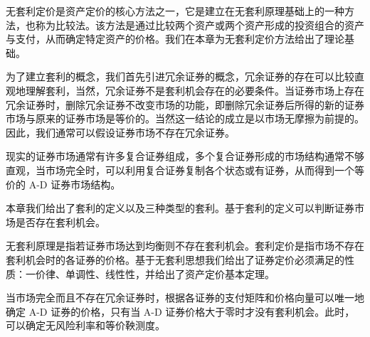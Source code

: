 

\begin{tcolorbox}[summary,title=本章小结]
无套利定价是资产定价的核心方法之一，它是建立在无套利原理基础上的一种方法，也称为比较法。该方法是通过比较两个资产或两个资产形成的投资组合的资产与支付，从而确定特定资产的价格。我们在本章为无套利定价方法给出了理论基础。

为了建立套利的概念，我们首先引进冗余证券的概念，冗余证券的存在可以比较直观地理解套利，当然，冗余证券不是套利机会存在的必要条件。当证券市场上存在冗余证券时，删除冗余证券不改变市场的功能，即删除冗余证券后所得的新的证券市场与原来的证券市场是等价的。当然这一结论的成立是以市场无摩擦为前提的。因此，我们通常可以假设证券市场不存在冗余证券。

现实的证券市场通常有许多复合证券组成，多个复合证券形成的市场结构通常不够直观，当市场完全时，可以利用复合证券复制各个状态或有证券，从而得到一个等价的 A-D 证券市场结构。

本章我们给出了套利的定义以及三种类型的套利。基于套利的定义可以判断证券市场是否存在套利机会。

无套利原理是指若证券市场达到均衡则不存在套利机会。套利定价是指市场不存在套利机会时的各证券的价格。基于无套利思想我们给出了证券定价必须满足的性质：一价律、单调性、线性性，并给出了资产定价基本定理。

当市场完全而且不存在冗余证券时，根据各证券的支付矩阵和价格向量可以唯一地确定 A-D 证券的价格，只有当 A-D 证券价格大于零时才没有套利机会。此时，可以确定无风险利率和等价鞅测度。
\end{tcolorbox}




